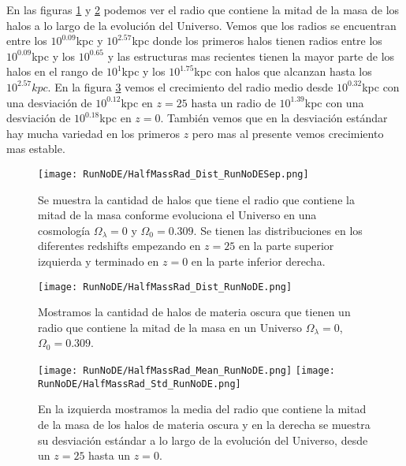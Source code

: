 En las figuras \ref{fig:NoDE-HalfMassRadDistSep} y \ref{fig:NoDE-HalfMassRadDist} podemos ver el radio que contiene la mitad de la masa de los halos a lo largo de la evolución del Universo. Vemos que los radios se encuentran entre los $10^{0.09}$kpc y $10^{2.57}$kpc donde los primeros halos tienen radios entre los $10^{0.09}$kpc y los $10^{0.65}$ y las estructuras mas recientes tienen la mayor parte de los halos en el rango de $10^{1}$kpc y los $10^{1.75}$kpc con halos que alcanzan hasta los $10^{2.57}kpc$. En la figura \ref{fig:NoDE-HalfMassRadStats} vemos el crecimiento del radio medio desde $10^{0.32}$kpc con una desviación de $10^{0.12}$kpc en $z=25$ hasta un radio de $10^{1.39}$kpc con una desviación de $10^{0.18}$kpc en $z=0$. También vemos que en la desviación estándar hay mucha variedad en los primeros $z$ pero mas al presente vemos crecimiento mas estable.

\begin{figure}[H]
    \centering
    \texttt{[image: RunNoDE/HalfMassRad\_Dist\_RunNoDESep.png]}
    \caption[Radio que contiene la mitad de la masa]{\footnotesize Se muestra la cantidad de halos que tiene el radio que contiene la mitad de la masa conforme evoluciona el Universo en una cosmología $\Omega_\lambda = 0$ y $\Omega_0 = 0.309$. Se tienen las distribuciones en los diferentes redshifts empezando en $z=25$ en la parte superior izquierda y terminado en $z=0$ en la parte inferior derecha.}
    \label{fig:NoDE-HalfMassRadDistSep}
\end{figure}

\begin{figure}[H]
    \centering
    \texttt{[image: RunNoDE/HalfMassRad\_Dist\_RunNoDE.png]}
    \caption[Distribución del radio que contiene la mitad de la masa]{\footnotesize Mostramos la cantidad de halos de materia oscura que tienen un radio que contiene la mitad de la masa en un Universo $\Omega_\lambda = 0$, $\Omega_0 = 0.309$.}
    \label{fig:NoDE-HalfMassRadDist}
\end{figure}

\begin{figure}[H]
    \centering
    \texttt{[image: RunNoDE/HalfMassRad\_Mean\_RunNoDE.png]}
    \texttt{[image: RunNoDE/HalfMassRad\_Std\_RunNoDE.png]}
    \caption[Media y desviación estándar del radio de la mitad de la masa]{\footnotesize En la izquierda mostramos la media del radio que contiene la mitad de la masa de los halos de materia oscura y en la derecha se muestra su desviación estándar a lo largo de la evolución del Universo, desde un $z=25$ hasta un $z=0$.}
    \label{fig:NoDE-HalfMassRadStats}
\end{figure}

